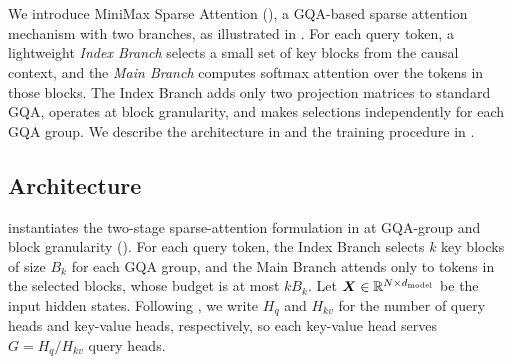 \section{\method{}}
\label{sec:method}

We introduce MiniMax Sparse Attention (\method{}), a GQA-based sparse attention mechanism with two branches, as illustrated in . For each query token, a lightweight \emph{Index Branch} selects a small set of key blocks from the causal context, and the \emph{Main Branch} computes softmax attention over the tokens in those blocks. The Index Branch adds only two projection matrices to standard GQA, operates at block granularity, and makes selections independently for each GQA group. We describe the architecture in  and the training procedure in .



\subsection{Architecture}
\label{sec:method-architecture}

\method{} instantiates the two-stage sparse-attention formulation in  at GQA-group and block granularity (). For each query token, the Index Branch selects $k$ key blocks of size $B_k$ for each GQA group, and the Main Branch attends only to tokens in the selected blocks, whose budget is at most $kB_k$.
Let ${\bm{X}} \in \mathbb{R}^{N \times d_{\rm model}}$ be the input hidden states. Following , we write $H_q$ and $H_{kv}$ for the number of query heads and key-value heads, respectively, so each key-value head serves $G = H_q/H_{kv}$ query heads.




